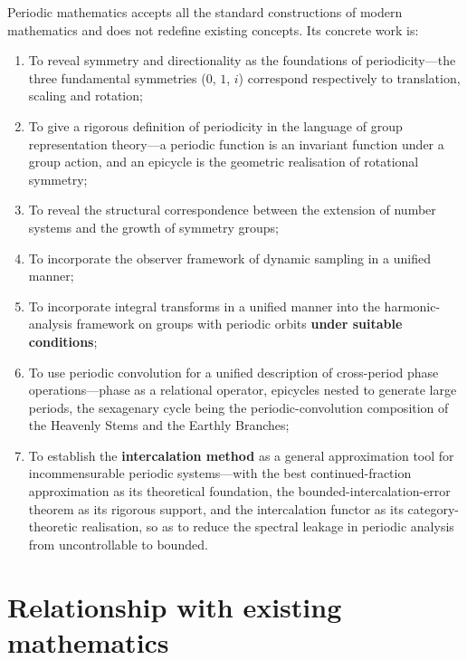 Periodic mathematics accepts all the standard constructions of modern mathematics and does not redefine existing concepts. Its concrete work is:
\begin{enumerate}[leftmargin=4em, label={(\arabic*)}]
    \item To reveal symmetry and directionality as the foundations of periodicity---the three fundamental symmetries ($0$, $1$, $i$) correspond respectively to translation, scaling and rotation;
    \item To give a rigorous definition of periodicity in the language of group representation theory---a periodic function is an invariant function under a group action, and an epicycle is the geometric realisation of rotational symmetry;
    \item To reveal the structural correspondence between the extension of number systems and the growth of symmetry groups;
    \item To incorporate the observer framework of dynamic sampling in a unified manner;
    \item To incorporate integral transforms in a unified manner into the harmonic-analysis framework on groups with periodic orbits \textbf{under suitable conditions};
    \item To use periodic convolution for a unified description of cross-period phase operations---phase as a relational operator, epicycles nested to generate large periods, the sexagenary cycle being the periodic-convolution composition of the Heavenly Stems and the Earthly Branches;
    \item To establish the \textbf{intercalation method} as a general approximation tool for incommensurable periodic systems---with the best continued-fraction approximation as its theoretical foundation, the bounded-intercalation-error theorem as its rigorous support, and the intercalation functor as its category-theoretic realisation, so as to reduce the spectral leakage in periodic analysis from uncontrollable to bounded.
\end{enumerate}

\section*{Relationship with existing mathematics}

